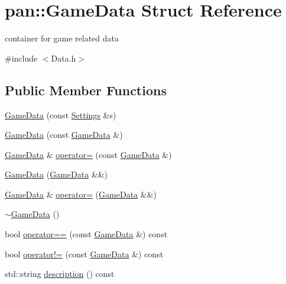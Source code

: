 \hypertarget{structpan_1_1_game_data}{}\section{pan\+:\+:Game\+Data Struct Reference}
\label{structpan_1_1_game_data}


container for game related data  




{\ttfamily \#include $<$Data.\+h$>$}

\subsection*{Public Member Functions}
\begin{DoxyCompactItemize}
\item 
\hyperlink{structpan_1_1_game_data_a4bd1e9348e4dc118d1345f25eb297006}{Game\+Data} (const \hyperlink{classpan_1_1_settings}{Settings} \&s)
\item 
\hyperlink{structpan_1_1_game_data_a7931bdb39d312dff7d9ba82e33e060f2}{Game\+Data} (const \hyperlink{structpan_1_1_game_data}{Game\+Data} \&)
\item 
\hyperlink{structpan_1_1_game_data}{Game\+Data} \& \hyperlink{structpan_1_1_game_data_a9668ac0f1009efc28e566fcf309ac8c8}{operator=} (const \hyperlink{structpan_1_1_game_data}{Game\+Data} \&)
\item 
\hyperlink{structpan_1_1_game_data_ac7446b6f725f4ac01c9b4ab264ef9459}{Game\+Data} (\hyperlink{structpan_1_1_game_data}{Game\+Data} \&\&)
\item 
\hyperlink{structpan_1_1_game_data}{Game\+Data} \& \hyperlink{structpan_1_1_game_data_a5552551e90f6b03fea9f94817ad6fe48}{operator=} (\hyperlink{structpan_1_1_game_data}{Game\+Data} \&\&)
\item 
\hyperlink{structpan_1_1_game_data_a70e8f41de449796ee998738e92968ba3}{$\sim$\+Game\+Data} ()
\item 
bool \hyperlink{structpan_1_1_game_data_a0c532468ff2f6ea4566f9cb6751769a3}{operator==} (const \hyperlink{structpan_1_1_game_data}{Game\+Data} \&) const
\item 
bool \hyperlink{structpan_1_1_game_data_a494ea898e63dcdb3bcdeef7953a05f06}{operator!=} (const \hyperlink{structpan_1_1_game_data}{Game\+Data} \&) const
\item 
std\+::string \hyperlink{structpan_1_1_game_data_a088e7f86c555691e29ccbeb31e742567}{description} () const
\end{DoxyCompactItemize}
